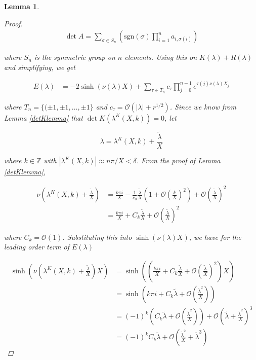 \documentclass[12pt]{article}
\def\Z{{\mathbb Z}}
\newtheorem{lemma}{Lemma}
\begin{document}
\begin{lemma}
\begin{proof}
\begin{align*}
\det A = \sum_{\sigma \in S_n} \left( \text{sgn}(\sigma) \prod_{i=1}^n a_{i, \sigma(i)} \right)
\end{align*}

where $S_n$ is the symmetric group on $n$ elements. Using this on $K(\lambda) + R(\lambda)$ and simplifying, we get

\begin{align*}
E(\lambda)
&= -2 \sinh(\nu(\lambda)X) + \sum_{\tau \in T_n}
c_\tau \prod_{j = 0}^{n-1} e^{\tau(j) \nu(\lambda)X_j}
\end{align*}

where $T_n = \{ (\pm 1, \pm 1, \dots, \pm 1 \}$ and $c_\tau = \mathcal{O}(|\lambda| + r^{1/2})$. Since we know from Lemma \ref{detKlemma} that $\det K(\lambda^K(X,k)) = 0$, let

\[
\lambda = \lambda^K(X,k) + \frac{\tilde{\lambda}}{X}
\]

where $k \in \Z$ with $|\lambda^K(X,k)| \approx n \pi / X < \delta$. From the proof of Lemma \ref{detKlemma}, 

\begin{align*}
\nu\left( \lambda^K(X, k) + \frac{\tilde{\lambda}}{X} \right) 
&= \frac{k \pi i}{X} -\frac{1}{c_0}\frac{\tilde{\lambda}}{X} \left( 1 + \mathcal{O} \left(\frac{k}{X}\right)^2 \right) + \mathcal{O}\left( \frac{\tilde{\lambda}}{X}\right)^2 \\
&= \frac{k \pi i}{X} + C_k \frac{\tilde{\lambda}}{X} + \mathcal{O}\left( \frac{\tilde{\lambda}}{X}\right)^2 
\end{align*}

where $C_k = \mathcal{O}(1)$. Substituting this into $\sinh(\nu(\lambda)X)$, we have for the leading order term of $E(\lambda)$

\begin{align*}
\sinh\left(\nu\left(\lambda^K(X, k) + \frac{\tilde{\lambda}}{X}\right)X\right)
&= \sinh\left(\left(\frac{k \pi i}{X} + C_k \frac{\tilde{\lambda}}{X} + \mathcal{O}\left( \frac{\tilde{\lambda}}{X}\right)^2 \right) X\right) \\
&= \sinh\left( k \pi i + C_k \tilde{\lambda} + \mathcal{O}\left( \frac{\tilde{\lambda}^2}{X}\right) \right) \\
&= (-1)^k \left( C_k \tilde{\lambda} + \mathcal{O}\left( \frac{\tilde{\lambda}^2}{X}\right) \right) + \mathcal{O}\left( \tilde{\lambda} + \frac{\tilde{\lambda}^2}{X} \right)^3 \\
&= (-1)^k C_k \tilde{\lambda} + \mathcal{O}\left( \frac{\tilde{\lambda}^2}{X} + \tilde{\lambda}^3 \right)
\end{align*}


\end{proof}
\end{lemma}
\end{document}
